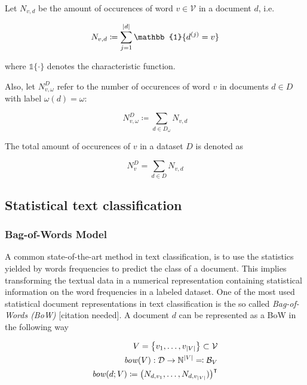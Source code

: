 Let $N_{v,d}$ be the amount of occurences of word $v \in \mathcal{V}$ in a
document $d$, i.e.

\begin{equation*}
N_{v,d} \coloneqq \sum\limits_{j=1}^{|d|} \mathbb{1}\{d^{(j)} = v\} \\
\end{equation*}

where $\mathbb{1}\{\cdot\}$ denotes the characteristic function.

Also, let $N_{v,\omega}^D$ refer to the number of occurences of word $v$ 
in documents $d \in D$ with label $\omega(d) = \omega$:

\begin{equation*}
N_{v,\omega}^D \coloneqq \sum\limits_{d \in D_\omega} N_{v,d}
\end{equation*}

The total amount of occurences of $v$ in a dataset $D$ is denoted as 

\begin{equation*}
	N_v^D = \sum\limits_{d \in D} N_{v,d}
\end{equation*}

\subsection{Statistical text classification}
\label{sec:statistical-tc}

\subsubsection{Bag-of-Words Model}
A common state-of-the-art method in text classification, is to use the
statistics yielded by words frequencies to predict the class of a document.
This implies transforming the textual data in a numerical representation
containing statistical information on the word frequencies in a labeled dataset.
One of the most used statistical document representations in text classification is the so called
\emph{Bag-of-Words (BoW)} [citation needed].
A document $d$ can be represented as a BoW in the following way

\begin{equation*}
\begin{split}
V = \left\{ v_1, \ldots, v_{|V|} \right\} \subset \mathcal{V} \\
\mathit{bow}(V): \mathcal{D} \to \mathbb{N}^{|V|} \eqqcolon \mathcal{B}_V \\
\mathit{bow}(d; V) \coloneqq \left(N_{d,v_1},  \ldots,
N_{d,v_{|V|}})\right)^\intercal
\end{split}
\end{equation*}

